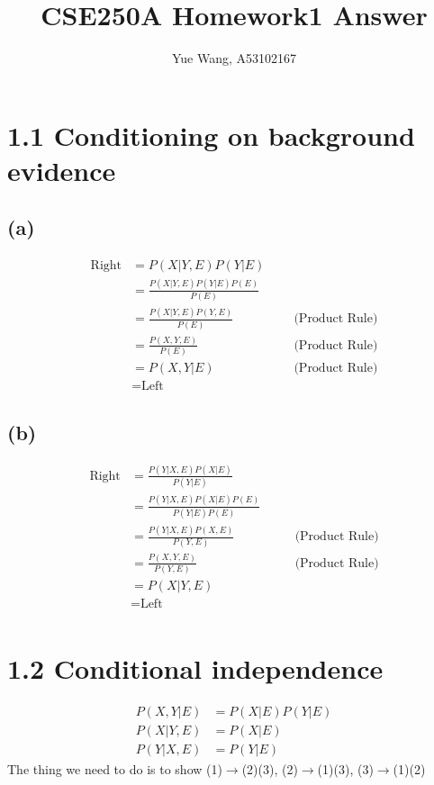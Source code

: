 \documentclass [11pt, a4paper, oneside] {article}
\author {Yue Wang, A53102167}
\title {CSE250A Homework1 Answer}
\begin{document}
\maketitle
\section *{1.1 Conditioning on background evidence}
\subsection *{(a)}
\begin {align*}
\textrm {Right} &= P(X|Y, E)P(Y|E)\\
&= \frac{P(X|Y, E)P(Y|E)P(E)}{P(E)}\\
&= \frac{P(X|Y, E)P(Y, E)}{P(E)} \qquad \qquad&\textrm{(Product Rule)} \\
&= \frac{P(X, Y, E)}{P(E)} &\textrm{(Product Rule)} \\
&= P(X, Y|E) &\textrm{(Product Rule)} \\
&=\textrm {Left} &
\end {align*}
\subsection *{(b)}
\begin {align*}
\textrm {Right} &= \frac{P(Y|X, E)P(X|E)}{P(Y|E)} & \\
& = \frac{P(Y|X, E)P(X|E)P(E)}{P(Y|E)P(E)} & \\
& = \frac{P(Y|X, E)P(X, E)}{P(Y, E)} \qquad \qquad &\textrm{(Product Rule)} \\
& = \frac{P(X, Y, E)}{P(Y, E)} &\textrm{(Product Rule)} \\
& = P(X|Y, E) & \\
& = \textrm {Left} \\
\end {align*}
\section * {1.2 Conditional independence}
\begin {align}
P(X, Y|E) &= P(X|E)P(Y|E)\\
P(X| Y, E) &= P(X|E) \\
P(Y| X, E) &= P(Y|E) 
\end {align}
The thing we need to do is to show (1)$\to$(2)(3), (2)$\to$(1)(3), (3)$\to$(1)(2)\\
\end{document}
